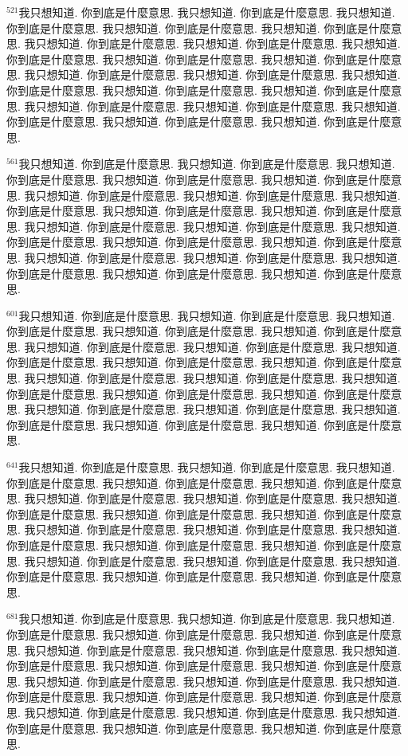 \documentclass{book}
\begin{document}
$^{521}$我只想知道.
你到底是什麼意思.
我只想知道.
你到底是什麼意思.
我只想知道.
你到底是什麼意思.
我只想知道.
你到底是什麼意思.
我只想知道.
你到底是什麼意思.
我只想知道.
你到底是什麼意思.
我只想知道.
你到底是什麼意思.
我只想知道.
你到底是什麼意思.
我只想知道.
你到底是什麼意思.
我只想知道.
你到底是什麼意思.
我只想知道.
你到底是什麼意思.
我只想知道.
你到底是什麼意思.
我只想知道.
你到底是什麼意思.
我只想知道.
你到底是什麼意思.
我只想知道.
你到底是什麼意思.
我只想知道.
你到底是什麼意思.
我只想知道.
你到底是什麼意思.
我只想知道.
你到底是什麼意思.
我只想知道.
你到底是什麼意思.
我只想知道.
你到底是什麼意思.

$^{561}$我只想知道.
你到底是什麼意思.
我只想知道.
你到底是什麼意思.
我只想知道.
你到底是什麼意思.
我只想知道.
你到底是什麼意思.
我只想知道.
你到底是什麼意思.
我只想知道.
你到底是什麼意思.
我只想知道.
你到底是什麼意思.
我只想知道.
你到底是什麼意思.
我只想知道.
你到底是什麼意思.
我只想知道.
你到底是什麼意思.
我只想知道.
你到底是什麼意思.
我只想知道.
你到底是什麼意思.
我只想知道.
你到底是什麼意思.
我只想知道.
你到底是什麼意思.
我只想知道.
你到底是什麼意思.
我只想知道.
你到底是什麼意思.
我只想知道.
你到底是什麼意思.
我只想知道.
你到底是什麼意思.
我只想知道.
你到底是什麼意思.
我只想知道.
你到底是什麼意思.

$^{601}$我只想知道.
你到底是什麼意思.
我只想知道.
你到底是什麼意思.
我只想知道.
你到底是什麼意思.
我只想知道.
你到底是什麼意思.
我只想知道.
你到底是什麼意思.
我只想知道.
你到底是什麼意思.
我只想知道.
你到底是什麼意思.
我只想知道.
你到底是什麼意思.
我只想知道.
你到底是什麼意思.
我只想知道.
你到底是什麼意思.
我只想知道.
你到底是什麼意思.
我只想知道.
你到底是什麼意思.
我只想知道.
你到底是什麼意思.
我只想知道.
你到底是什麼意思.
我只想知道.
你到底是什麼意思.
我只想知道.
你到底是什麼意思.
我只想知道.
你到底是什麼意思.
我只想知道.
你到底是什麼意思.
我只想知道.
你到底是什麼意思.
我只想知道.
你到底是什麼意思.

$^{641}$我只想知道.
你到底是什麼意思.
我只想知道.
你到底是什麼意思.
我只想知道.
你到底是什麼意思.
我只想知道.
你到底是什麼意思.
我只想知道.
你到底是什麼意思.
我只想知道.
你到底是什麼意思.
我只想知道.
你到底是什麼意思.
我只想知道.
你到底是什麼意思.
我只想知道.
你到底是什麼意思.
我只想知道.
你到底是什麼意思.
我只想知道.
你到底是什麼意思.
我只想知道.
你到底是什麼意思.
我只想知道.
你到底是什麼意思.
我只想知道.
你到底是什麼意思.
我只想知道.
你到底是什麼意思.
我只想知道.
你到底是什麼意思.
我只想知道.
你到底是什麼意思.
我只想知道.
你到底是什麼意思.
我只想知道.
你到底是什麼意思.
我只想知道.
你到底是什麼意思.

$^{681}$我只想知道.
你到底是什麼意思.
我只想知道.
你到底是什麼意思.
我只想知道.
你到底是什麼意思.
我只想知道.
你到底是什麼意思.
我只想知道.
你到底是什麼意思.
我只想知道.
你到底是什麼意思.
我只想知道.
你到底是什麼意思.
我只想知道.
你到底是什麼意思.
我只想知道.
你到底是什麼意思.
我只想知道.
你到底是什麼意思.
我只想知道.
你到底是什麼意思.
我只想知道.
你到底是什麼意思.
我只想知道.
你到底是什麼意思.
我只想知道.
你到底是什麼意思.
我只想知道.
你到底是什麼意思.
我只想知道.
你到底是什麼意思.
我只想知道.
你到底是什麼意思.
我只想知道.
你到底是什麼意思.
我只想知道.
你到底是什麼意思.
我只想知道.
你到底是什麼意思.
\end{document}
